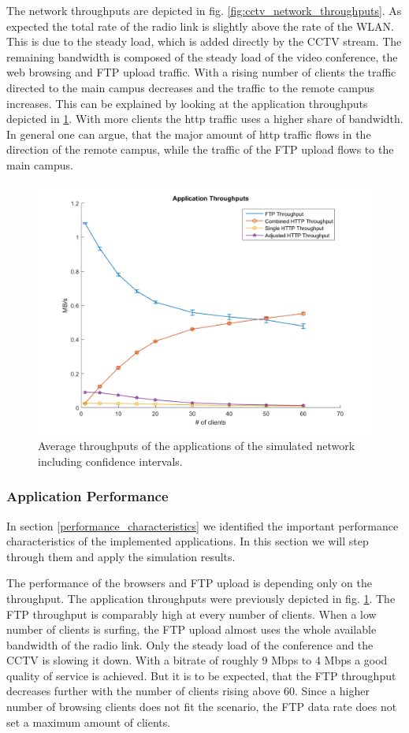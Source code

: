 \documentclass[
10pt, %
a4paper, %
oneside, %
headinclude,footinclude, %
BCOR5mm, %
]{scrartcl}
\begin{document}
The network throughputs are depicted in fig. \ref{fig:cctv_network_throughputs}. As expected the total rate of the radio link is slightly above the rate of the WLAN. This is due to the steady load, which is added directly by the CCTV stream. The remaining bandwidth is composed of the steady load of the video conference, the web browsing and FTP upload traffic. With a rising number of clients the traffic directed to the main campus decreases and the traffic to the remote campus increases. This can be explained by looking at the application throughputs depicted in \ref{fig:cctv_app_throughput_all}. With more clients the http traffic uses a higher share of bandwidth. In general one can argue, that the major amount of http traffic flows in the direction of the remote campus, while the traffic of the FTP upload flows to the main campus.
\begin{figure}[!ht]
  \centering
  \includegraphics[width=\textwidth]{Figures/cctv/Application_Throughputs.png}
  \caption{Average throughputs of the applications of the simulated network including confidence intervals.} \label{fig:cctv_app_throughput_all}
\end{figure}
\subsubsection{Application Performance}
In section \ref{performance_characteristics} we identified the important performance characteristics of the implemented applications. In this section we will step through them and apply the simulation results.

The performance of the browsers and FTP upload is depending only on the throughput. The application throughputs were previously depicted in fig. \ref{fig:cctv_app_throughput_all}.
The FTP throughput is comparably high at every number of clients. When a low number of clients is surfing, the FTP upload almost uses the whole available bandwidth of the radio link. Only the steady load of the conference and the CCTV is slowing it down. With a bitrate of roughly 9 Mbps to 4 Mbps a good quality of service is achieved. But it is to be expected, that the FTP throughput decreases further with the number of clients rising above 60. Since a higher number of browsing clients does not fit the scenario, the FTP data rate does not set a maximum amount of clients.
\end{document}
